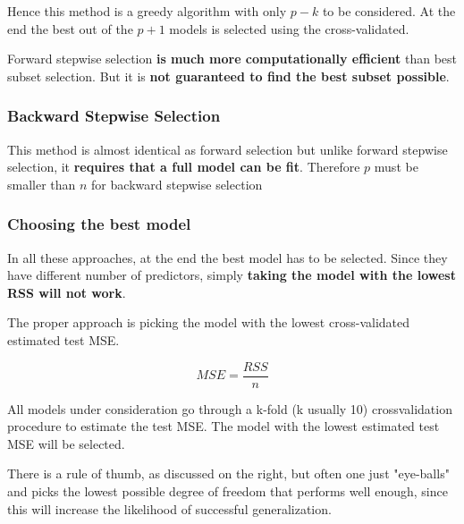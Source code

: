 \documentclass[../Main.tex]{subfiles}
\begin{document}
\begin{multicols}{2}
    Hence this method is a greedy algorithm with only \(p-k\) to be considered.
    At the end the best out of the \(p+1\) 
    models is selected using the cross-validated.

    Forward stepwise selection \textbf{is much more computationally efficient} than best subset selection.
    But it is \textbf{not guaranteed to find the best subset possible}.
    
    \subsubsection{Backward Stepwise Selection}
    This method is almost identical as forward selection but
    unlike forward stepwise selection, 
    it \textbf{requires that a full model can be fit}.
    Therefore \(p\) must be smaller than \(n\) for backward stepwise selection 
\end{multicols}

\subsubsection{Choosing the best model}
In all these approaches, at the end the best model has to be selected.
Since they have different number of predictors, simply \textbf{taking the model with the lowest RSS will not work}.

The proper approach is picking the model with the lowest cross-validated estimated test 
MSE.

\begin{equation*}
    MSE=\frac{RSS}{n}
\end{equation*}

All models under consideration go through a k-fold (k usually 10) crossvalidation procedure to estimate the test 
MSE. The model with the lowest estimated test MSE will be selected.

There is a rule of thumb, as discussed on 
the right, but often one just "eye-balls" and 
picks the lowest possible degree of 
freedom that performs well enough, since 
this will increase the likelihood of 
successful generalization.

\end{document}
